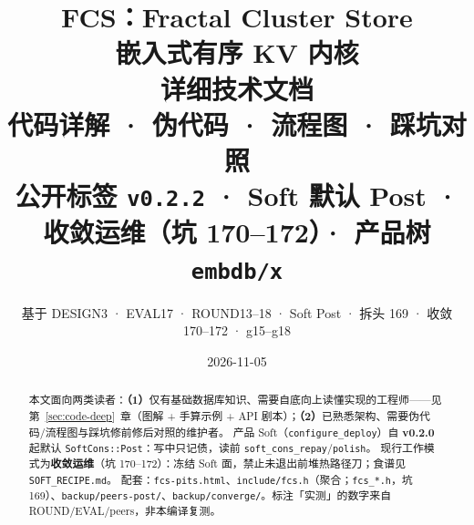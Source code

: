 \documentclass[UTF8,a4paper,11pt,fancyhdr,oneside]{ctexart}
\title{\textbf{FCS：Fractal Cluster Store}\\[0.35em]
\large 嵌入式有序 KV 内核\\详细技术文档\\[0.25em]
\normalsize 代码详解 · 伪代码 · 流程图 · 踩坑对照\\[0.15em]
\footnotesize 公开标签 \texttt{v0.2.2} · Soft 默认 Post · 收敛运维（坑 170--172）· 产品树 \texttt{embdb/x}}
\author{基于 DESIGN3 · EVAL17 · ROUND13--18 · Soft Post · 拆头 169 · 收敛 170--172 · g15--g18}
\date{2026-11-05}
\begin{document}
\maketitle

\begin{abstract}
\noindent
本文面向两类读者：\textbf{（1）}仅有基础数据库知识、需要自底向上读懂实现的工程师——见第~\ref{sec:code-deep}~章（图解 + 手算示例 + API 剧本）；\textbf{（2）}已熟悉架构、需要伪代码/流程图与踩坑修前修后对照的维护者。
产品 Soft（\texttt{configure\_deploy}）自 \textbf{v0.2.0} 起默认 \texttt{SoftCons::Post}：写中只记债，读前 \texttt{soft\_cons\_repay}/\texttt{polish}。
现行工作模式为\textbf{收敛运维}（坑 170--172）：冻结 Soft 面，禁止未退出前堆热路径刀；食谱见 \texttt{SOFT\_RECIPE.md}。
配套：\texttt{fcs-pits.html}、\texttt{include/fcs.h}（聚合；\texttt{fcs\_*.h}，坑 169）、\texttt{backup/peers-post/}、\texttt{backup/converge/}。标注「实测」的数字来自 ROUND/EVAL/peers，非本编译复测。
\end{abstract}

\tableofcontents
\newpage













\appendix


\end{document}
